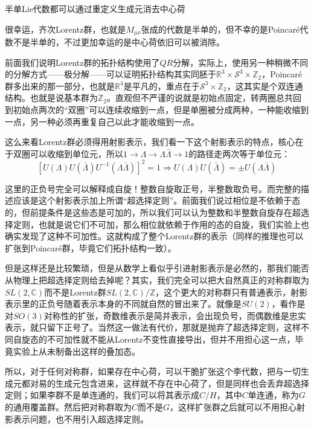 \begin{theorem}
	半单Lie代数都可以通过重定义生成元消去中心荷
\end{theorem}
很幸运，齐次Lorentz群，也就是$M_{\mu\nu}$张成的代数是半单的，但不幸的是Poincar\'e代数不是半单的，不过更加幸运的是中心荷依旧可以被消除。

前面我们说明Lorentz群的拓扑结构使用了$QR$分解，实际上，使用另一种稍微不同的分解方式——极分解——可以证明拓扑结构其实同胚于$\mathbb{R}^3\times\mathcal{S}^3\times\mathbb{Z}_2$，Poincar\'e群多出来的那一部分，也就是$\mathbb{R}^4$是平凡的，重点在于$\mathcal{S}^3\times\mathbb{Z}_2$，这其实是个双连通结构。也就是说基本群为$\mathbb{Z}_2$。直观但不严谨的说就是初始点固定，转两圈总共回到初始点两次的“双圈”可以连续收缩到一点，但是单圈被分成两种，一种能收缩到一点，另一种必须再重复自己以此才能收缩到一点。

这么来看Lorentz群必须得用射影表示，我们看一下这个射影表示的特点，核心在于双圈可以收缩到单位元，所以$1\to\Lambda\to\Lambda\bar\Lambda\to1$的路径走两次等于单位元：
\begin{equation}
	\left[U(\Lambda)U(\bar\Lambda)U^{-1}(\Lambda\bar\Lambda)\right]^2=1\Rightarrow U(\Lambda)U(\bar\Lambda)=\pm U(\Lambda\bar\Lambda)
\end{equation} 

这里的正负号完全可以解释成自旋！整数自旋取正号，半整数取负号。而完整的描述应该是这个射影表示加上所谓“超选择定则”。前面我们说过相位是不依赖于态的，但前提条件是这些态是可加的，所以我们可以认为整数和半整数自旋存在超选择定则，也就是说它们不可加，那么相位就依赖于作用的态的自旋，我们实验上也确实发现了这种不可加性。这就构成了整个Lorentz群的表示（同样的推理也可以扩张到Poincar\'e群，毕竟它们拓扑结构一致）。

但是这样还是比较繁琐，但是从数学上看似乎引进射影表示是必然的，那我们能否从物理上把超选择定则给去掉呢？其实，我们完全可以把大自然真正的对称群取为$SL(2,\mathbb{C})$而不是Lorentz群$SL(2,\mathbb{C})/\mathbb{Z}$，这个更大的对称群只有普通表示，射影表示里的正负号随着表示本身的不同就自然的冒出来了。就像是$SU(2)$，看作是对$SO(3)$对称性的扩张，奇数维表示是简并表示，会出现负号，而偶数维是忠实表示，就只留下正号了。当然这一做法有代价，那就是抛弃了超选择定则，这样不同自旋态的不可加性就不能从Lorentz不变性直接导出，但并不用担心这一点，毕竟实验上从未制备出这样的叠加态。

所以，对于任何对称群，如果存在中心荷，可以干脆扩张这个李代数，把与一切生成元都对易的生成元包含进来，这样就不存在中心荷了，但是同样也会丢弃超选择定则；如果李群不是单连通的，我们可以将其表示成$C/H$，其中$C$单连通，称为$G$的通用覆盖群。然后把对称群取为$C$而不是$G$，这样扩张群之后就可以不用担心射影表示问题，也不用引入超选择定则。